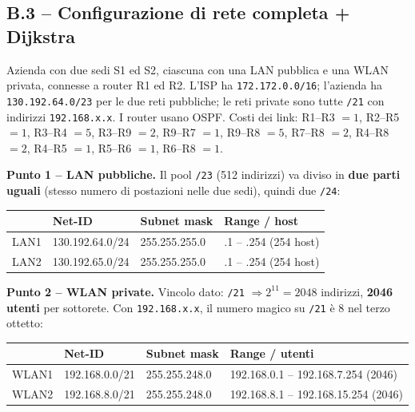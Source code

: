 \documentclass[12pt, a4paper]{article}
\begin{document}
\subsection*{B.3 -- Configurazione di rete completa + Dijkstra}

\begin{tcolorbox}[colback=orange!5, colframe=orange!70!black, title=\textbf{Esercizio B.3 -- ``Company'' (traccia d'esame Lo Cigno)}]
Azienda con due sedi S1 ed S2, ciascuna con una LAN pubblica e una WLAN privata, connesse a router R1 ed R2. L'ISP ha \texttt{172.172.0.0/16}; l'azienda ha \texttt{130.192.64.0/23} per le due reti pubbliche; le reti private sono tutte \texttt{/21} con indirizzi \texttt{192.168.x.x}. I router usano OSPF. Costi dei link: R1--R3 $=1$, R2--R5 $=1$, R3--R4 $=5$, R3--R9 $=2$, R9--R7 $=1$, R9--R8 $=5$, R7--R8 $=2$, R4--R8 $=2$, R4--R5 $=1$, R5--R6 $=1$, R6--R8 $=1$.

\bigskip
\textbf{Punto 1 -- LAN pubbliche.} Il pool \texttt{/23} (512 indirizzi) va diviso in \textbf{due parti uguali} (stesso numero di postazioni nelle due sedi), quindi due \texttt{/24}:
\begin{center}
\small
\begin{tabular}{llll}
\toprule
 & \textbf{Net-ID} & \textbf{Subnet mask} & \textbf{Range / host} \\
\midrule
LAN1 & 130.192.64.0/24 & 255.255.255.0 & .1 -- .254 \quad (254 host) \\
LAN2 & 130.192.65.0/24 & 255.255.255.0 & .1 -- .254 \quad (254 host) \\
\bottomrule
\end{tabular}
\end{center}

\textbf{Punto 2 -- WLAN private.} Vincolo dato: \texttt{/21} $\Rightarrow 2^{11}=2048$ indirizzi, \textbf{2046 utenti} per sottorete. Con \texttt{192.168.x.x}, il numero magico su \texttt{/21} è 8 nel terzo ottetto:
\begin{center}
\small
\begin{tabular}{llll}
\toprule
 & \textbf{Net-ID} & \textbf{Subnet mask} & \textbf{Range / utenti} \\
\midrule
WLAN1 & 192.168.0.0/21 & 255.255.248.0 & 192.168.0.1 -- 192.168.7.254 \quad (2046) \\
WLAN2 & 192.168.8.0/21 & 255.255.248.0 & 192.168.8.1 -- 192.168.15.254 \quad (2046) \\
\bottomrule
\end{tabular}
\end{center}


\end{tcolorbox}
\end{document}
